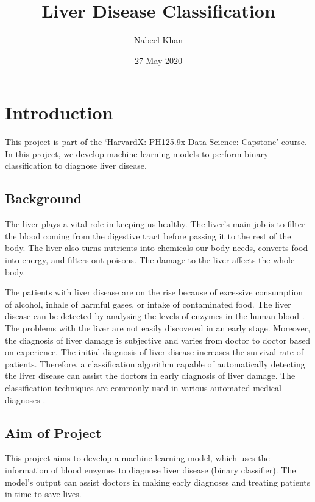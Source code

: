 \documentclass[]{article}
\title{Liver Disease Classification}
\author{Nabeel Khan}
\date{27-May-2020}
\begin{document}
\maketitle

{
\setcounter{tocdepth}{2}
\tableofcontents
}
\section{Introduction}
\label{sec:introduction}

This project is part of the `HarvardX: PH125.9x Data Science: Capstone'
course. In this project, we develop machine learning models to perform
binary classification to diagnose liver disease.

\subsection{Background}
\label{sec:background}

The liver plays a vital role in keeping us healthy. The liver's main job
is to filter the blood coming from the digestive tract before passing it
to the rest of the body. The liver also turns nutrients into chemicals
our body needs, converts food into energy, and filters out poisons. The
damage to the liver affects the whole body.

The patients with liver disease are on the rise because of excessive
consumption of alcohol, inhale of harmful gases, or intake of
contaminated food. The liver disease can be detected by analysing the
levels of enzymes in the human blood \cite{ld,bendi}. The problems with
the liver are not easily discovered in an early stage. Moreover, the
diagnosis of liver damage is subjective and varies from doctor to doctor
based on experience. The initial diagnosis of liver disease increases
the survival rate of patients. Therefore, a classification algorithm
capable of automatically detecting the liver disease can assist the
doctors in early diagnosis of liver damage. The classification
techniques are commonly used in various automated medical diagnoses
\cite{cad}.

\subsection{Aim of Project}
\label{sec:aim}

This project aims to develop a machine learning model, which uses the
information of blood enzymes to diagnose liver disease (binary
classifier). The model's output can assist doctors in making early
diagnoses and treating patients in time to save lives.
\end{document}
